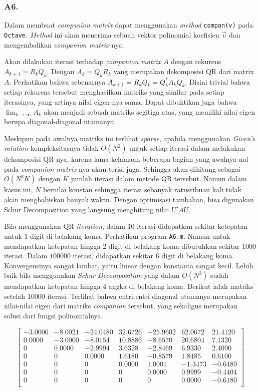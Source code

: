 \documentclass[11pt, a4paper, onecolumn, oneside, final]{report}
\begin{document}
\subsubsection*{A6.}

Dalam membuat \textit{companion matrix} dapat menggunakan \textit{method} \texttt{compan(v)} pada \texttt{Octave}. \textit{Method} ini akan menerima sebuah vektor polinomial koefisien $\vec{v}$ dan mengembalikan \textit{companion matrix}-nya.

Akan dilakukan iterasi terhadap \textit{companion matrix} $A$ dengan rekurens $A_{k+1} = R_k Q_k$. Dengan $A_k = Q_k R_k$ yang merupakan dekomposisi QR dari matrix $A$. Perhatikan bahwa sebenarnya $A_{k+1} = R_k Q_k = Q_k^*A_kQ_k$. Disini trivial bahwa setiap rekurens tersebut menghasilkan matriks yang similar pada setiap iterasinya, yang artinya nilai eigen-nya sama. Dapat dibuktikan juga bahwa $\lim_{k \to \infty}A_k$ akan menjadi sebuah matriks segitiga atas, yang memiliki nilai eigen berupa diagonal-diagonal utamanya.

Meskipun pada awalnya matriks ini terlihat \textit{sparse}, apabila menggunakan \textit{Given's rotation} kompleksitasnya tidak $O(N^2)$ untuk setiap iterasi dalam melakukan dekomposisi QR-nya, karena lama kelamaan beberapa bagian yang awalnya nol pada \textit{companion matrix}-nya akan terisi juga. Sehingga akan dihitung sebagai $O(N^3K)$ dengan $K$ jumlah iterasi dalam metode QR tersebut. Namun dalam kasus ini, $N$ bernilai konstan sehingga iterasi sebanyak ratusribuan kali tidak akan menghabiskan banyak waktu. Dengan optimisasi tambahan, bisa digunakan Schur Decomposition yang langsung menghitung nilai $U'AU$.

Bila menggunakan QR \textit{iteration}, dalam 10 iterasi didapatkan sekitar ketepatan untuk 1 digit di belakang koma. Perhatikan program \texttt{A6.m}. Namun untuk mendapatkan ketepatan hingga 2 digit di belakang koma dibutuhkan sekitar $1000$ iterasi. Dalam $100000$ iterasi, didapatkan sekitar 6 digit di belakang koma. Konvergensinya sangat lambat, yaitu linear dengan konstanta sangat kecil. Lebih baik bila menggunakan \textit{Schur Decomposition} yang dalam $O(N^3)$ sudah mendapatkan ketepatan hingga 4 angka di belakang koma. Berikut ialah matriks setelah $10000$ iterasi. Terlihat bahwa entri-entri diagonal utamanya merupakan nilai-nilai eigen dari matriks \textit{companion} tersebut, yang sekaligus merupakan solusi dari fungsi polinomialnya.

$$
\begin{bmatrix}
-3.0006& -8.0021& -24.0480& 32.6726& -25.9602& 62.0672& 21.4120\\
 0.0000& -3.0000& -8.0154& 10.8886& -8.6570& 20.6804& 7.1320\\
 0& 0.0000& -2.9994& 3.6328& -2.8469& 6.9330& 2.4090\\
 0& 0& 0.0000& 1.6180& -0.8579& 1.8485& 0.6100\\
 0& 0& 0& 0.0000& 1.0001& -1.3473& -0.6489\\
 0& 0& 0& 0& 0.0000& 0.9999& -0.4404\\
 0& 0& 0& 0& 0& 0.0000& -0.6180\\
\end{bmatrix}
$$
\end{document}
